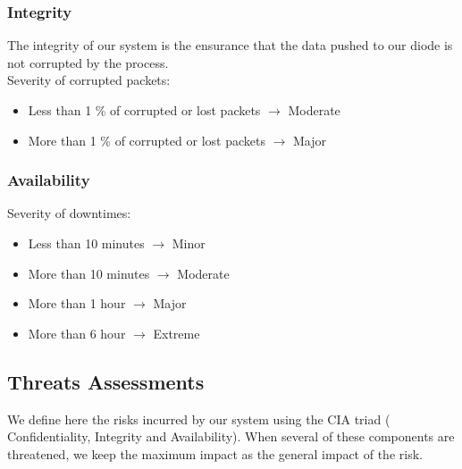 \documentclass[a4paper,11pt]{article}
\begin{document}
\subsubsection{Integrity}
The integrity of our system is the ensurance that the data pushed to our diode is not corrupted by the process.\\
Severity of corrupted packets:
\begin{itemize}
\item Less than 1 \% of corrupted or lost packets $\rightarrow$ Moderate
\item More than 1 \% of corrupted or lost packets $\rightarrow$ Major
\end{itemize}
\subsubsection{Availability}
Severity of downtimes:
\begin{itemize}
\item Less than 10 minutes $\rightarrow$ Minor
\item More than 10 minutes $\rightarrow$ Moderate
\item More than 1 hour $\rightarrow$ Major
\item More than 6 hour $\rightarrow$ Extreme
\end{itemize}
\subsection{Threats Assessments}
We define here the risks incurred by our system using the CIA triad ( Confidentiality, Integrity and Availability). When several of these components are threatened, we keep the maximum impact as the general impact of the risk.
\end{document}
